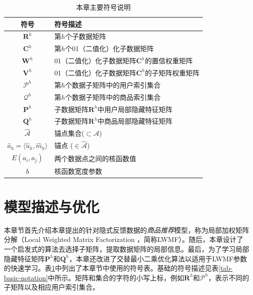 \begin{table}
	\centering
	\caption{本章主要符号说明}
	\label{tab-lwmf-notation}%
	
	\begin{tabular}{cp{}}
		\hline
		符号 & 符号描述 \bigstrut \\
		\hline\hline
		$\mathbf{R}^h$ & 第$h$个子数据矩阵 \bigstrut\\
		$\mathbf{C}^h$ &第$h$个01（二值化）化子数据矩阵  \bigstrut\\
		$ \mathbf{W}^h$ &01（二值化）化子数据矩阵$\mathbf{C}^h$的置信权重矩阵\bigstrut\\
		$ \mathbf{V}^h$ & 01（二值化）化子数据矩阵$\mathbf{C}^h$的子矩阵权重矩阵 \bigstrut\\
		$ \mathcal{P}^h$ &第$h$个数据子矩阵中的用户索引集合  \bigstrut\\
		$ \mathcal{Q}^h$ &第$h$个数据子矩阵中的商品索引集合  \bigstrut\\
		$ \mathbf{P}^h$  & 子数据矩阵$\mathbf{R}^h$中用户局部隐藏特征矩阵 \bigstrut\\
		$\mathbf{Q}^h$  & 子数据矩阵$\mathbf{R}^h$中商品局部隐藏特征矩阵 \bigstrut\\
		\hline
		$ \mathcal{\hat{A}}$ & 锚点集合($\subset \mathcal{A}$) \bigstrut\\
		$\hat{a}_h=\langle\hat{u}_h, \hat{m}_h\rangle$ & 锚点  ($\in \mathcal{\hat{A}}$)   \bigstrut\\
		$E(a_i, a_j)$ & 两个数据点之间的核函数值 \bigstrut\\
		$b$ & 核函数宽度参数 \bigstrut\\
		\hline
	\end{tabular}
\end{table}


\section{模型描述与优化}
\label{sec-lwmf-lwmf}
本章节首先介绍本章提出的针对隐式反馈数据的\textit{商品推荐}模型，称为局部加权矩阵分解（Local Weighted Matrix Factorization ，简称LWMF）。随后，本章设计了一个启发式的算法去选择子矩阵，提取数据矩阵的局部信息。最后，为了学习局部隐藏特征矩阵$\mathbf{P}^h$和$\mathbf{Q}^h$，本章还改进了交替最小二乘优化算法以适用于LWMF参数的快速学习。表\ref{tab-lwmf-notation}中列出了本章节中使用的符号表。基础的符号描述见表\ref{tab-basic-notation}中所示。矩阵和集合的字符的小写上标，例如$\mathbf{R}^h$和$\mathcal{P}^h$，表示不同的子矩阵以及相应用户索引集合。

